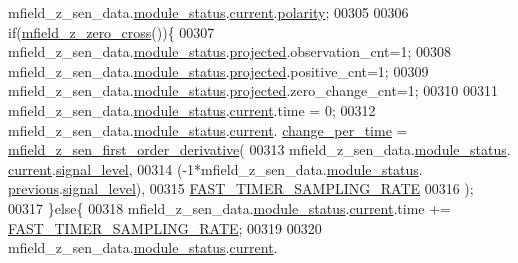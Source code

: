 \begin{DoxyCode}
      mfield\_z\_sen\_data.\hyperlink{a00027_adfab5a5d8b45a93dfb13edb24e2b80e3}{module\_status}.\hyperlink{a00019_acf41ffc11da291c2f9f0fcb02ee72b98}{current}.\hyperlink{a00019_a45152a3cd909463d7c924c30b575a073}{polarity};
00305 
00306     \textcolor{keywordflow}{if}(\hyperlink{a00053_a8830f50d7a451bec0a7d61c44d5cd98b}{mfield\_z\_zero\_cross}())\{
00307          mfield\_z\_sen\_data.\hyperlink{a00027_adfab5a5d8b45a93dfb13edb24e2b80e3}{module\_status}.\hyperlink{a00019_af2267fb093fb5dcaa006a570a6da3b6b}{projected}.observation\_cnt=1;
00308          mfield\_z\_sen\_data.\hyperlink{a00027_adfab5a5d8b45a93dfb13edb24e2b80e3}{module\_status}.\hyperlink{a00019_af2267fb093fb5dcaa006a570a6da3b6b}{projected}.positive\_cnt=1;
00309          mfield\_z\_sen\_data.\hyperlink{a00027_adfab5a5d8b45a93dfb13edb24e2b80e3}{module\_status}.\hyperlink{a00019_af2267fb093fb5dcaa006a570a6da3b6b}{projected}.zero\_change\_cnt=1;
00310 
00311          mfield\_z\_sen\_data.\hyperlink{a00027_adfab5a5d8b45a93dfb13edb24e2b80e3}{module\_status}.\hyperlink{a00019_acf41ffc11da291c2f9f0fcb02ee72b98}{current}.time = 0;
00312          mfield\_z\_sen\_data.\hyperlink{a00027_adfab5a5d8b45a93dfb13edb24e2b80e3}{module\_status}.\hyperlink{a00019_acf41ffc11da291c2f9f0fcb02ee72b98}{current}.
      \hyperlink{a00019_a0f645dd76b41adc6a966feba8e4bff8c}{change\_per\_time} = \hyperlink{a00053_a82939d05c14b8ab80cacc21b7a1b8d3e}{mfield\_z\_sen\_first\_order\_derivative}(
00313                                             mfield\_z\_sen\_data.\hyperlink{a00027_adfab5a5d8b45a93dfb13edb24e2b80e3}{module\_status}.
      \hyperlink{a00019_acf41ffc11da291c2f9f0fcb02ee72b98}{current}.\hyperlink{a00019_a4070db8eab0ff93e3fbc1df59872f117}{signal\_level},
00314                                             (-1*mfield\_z\_sen\_data.\hyperlink{a00027_adfab5a5d8b45a93dfb13edb24e2b80e3}{module\_status}.
      \hyperlink{a00019_adcb859b2f3983a9c58deab28e59c333f}{previous}.\hyperlink{a00019_a4070db8eab0ff93e3fbc1df59872f117}{signal\_level}),
00315                                             \hyperlink{a00021_a3a4dcb8af26a561d90607a41a3745806}{FAST\_TIMER\_SAMPLING\_RATE}
00316                                             );
00317     \}\textcolor{keywordflow}{else}\{
00318         mfield\_z\_sen\_data.\hyperlink{a00027_adfab5a5d8b45a93dfb13edb24e2b80e3}{module\_status}.\hyperlink{a00019_acf41ffc11da291c2f9f0fcb02ee72b98}{current}.time += 
      \hyperlink{a00021_a3a4dcb8af26a561d90607a41a3745806}{FAST\_TIMER\_SAMPLING\_RATE};
00319 
00320         mfield\_z\_sen\_data.\hyperlink{a00027_adfab5a5d8b45a93dfb13edb24e2b80e3}{module\_status}.\hyperlink{a00019_acf41ffc11da291c2f9f0fcb02ee72b98}{current}.

\end{DoxyCode}
